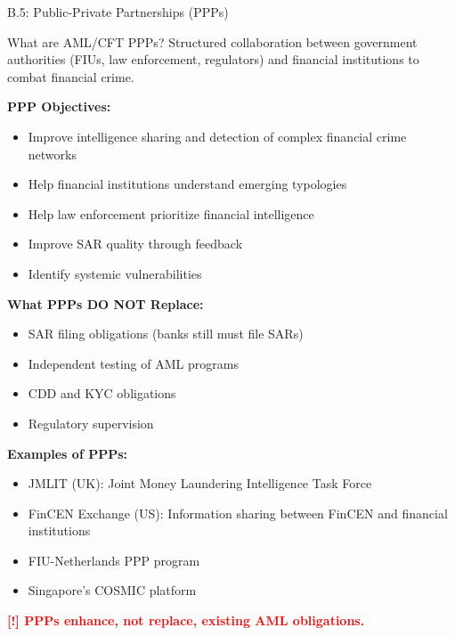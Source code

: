 \documentclass[11pt,a4paper]{beamer}
\newcommand{\redflag}[1]{\textcolor{red}{\textbf{[!] #1}}}
\begin{document}
	\begin{frame}{B.5: Public-Private Partnerships (PPPs)}
		\begin{block}{What are AML/CFT PPPs?}
			Structured collaboration between government authorities (FIUs, law enforcement, regulators) and financial institutions to combat financial crime.
		\end{block}
		\textbf{PPP Objectives:}
		\begin{itemize}
			\item Improve intelligence sharing and detection of complex financial crime networks
			\item Help financial institutions understand emerging typologies
			\item Help law enforcement prioritize financial intelligence
			\item Improve SAR quality through feedback
			\item Identify systemic vulnerabilities
		\end{itemize}
		\textbf{What PPPs DO NOT Replace:}
		\begin{itemize}
			\item SAR filing obligations (banks still must file SARs)
			\item Independent testing of AML programs
			\item CDD and KYC obligations
			\item Regulatory supervision
		\end{itemize}
		\textbf{Examples of PPPs:}
		\begin{itemize}
			\item JMLIT (UK): Joint Money Laundering Intelligence Task Force
			\item FinCEN Exchange (US): Information sharing between FinCEN and financial institutions
			\item FIU-Netherlands PPP program
			\item Singapore's COSMIC platform
		\end{itemize}
		\redflag{PPPs enhance, not replace, existing AML obligations.}
	\end{frame}
	
\end{document}
